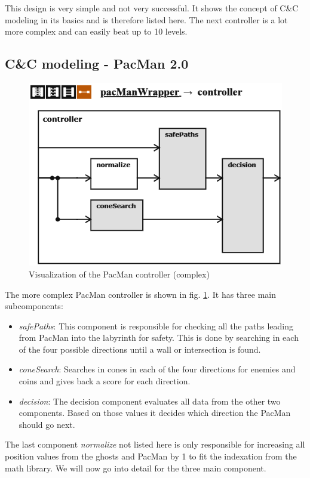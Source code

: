 This design is very simple and not very successful. It shows the concept of C\&C modeling in its basics and is therefore listed here. The next controller is a lot more complex and can easily beat up to 10 levels.

\subsection{C\&C modeling - PacMan 2.0}
\begin{figure}
	\label{fig:visPacman20}
	\centering
	\includegraphics[scale=0.85]{pictures/PacMan/Controller20.png}
	\caption{Visualization of the PacMan controller (complex)}
\end{figure}

The more complex PacMan controller is shown in fig. \ref{fig:visPacman20}.
It has three main subcomponents:
\begin{itemize}
	\item \textit{safePaths}: This component is responsible for checking all the paths leading from PacMan into the labyrinth for safety. This is done by searching in each of the four possible directions until a wall or intersection is found.	
	\item \textit{coneSearch}: Searches in cones in each of the four directions for enemies and coins and gives back a score for each direction.	
	\item \textit{decision}: The decision component evaluates all data from the other two components. Based on those values it decides which direction the PacMan should go next.	
\end{itemize}
The last component \textit{normalize} not listed here is only responsible for increasing all position values from the ghosts and PacMan by 1 to fit the indexation from the math library.
We will now go into detail for the three main component.

